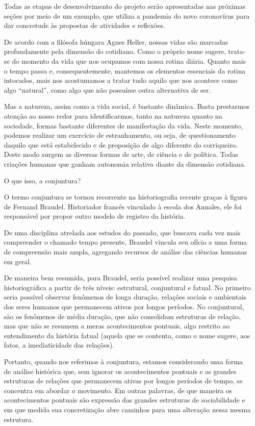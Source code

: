 Todas as etapas de desenvolvimento do projeto serão apresentadas nas próximas seções por meio de um exemplo, que utiliza a pandemia do novo coronavírus para dar concretude às propostas de atividades e reflexões.


De acordo com a filósofa húngara Agnes Heller, nossas vidas são marcadas profundamente pela dimensão do cotidiano. Como o próprio nome sugere, trata-se do momento da vida que nos ocupamos com nossa rotina diária. Quanto mais o tempo passa e, consequentemente, mantemos os elementos essenciais da rotina intocados, mais nos acostumamos a tratar tudo aquilo que nos acontece como algo “natural”, como algo que não possuísse outra alternativa de ser.

Mas a natureza, assim como a vida social, é bastante dinâmica. Basta prestarmos atenção ao nosso redor para identificarmos, tanto na natureza quanto na sociedade, formas bastante diferentes de manifestação da vida. Neste momento, podemos realizar um exercício de estranhamento, ou seja, de questionamento daquilo que está estabelecido e de proposição de algo diferente do corriqueiro. Deste modo surgem as diversas formas de arte, de ciência e de política. Todas criações humanas que ganham autonomia relativa diante da dimensão cotidiana.

\begin{knowledge}{O que isso, a conjuntura?}

O termo conjuntura se tornou recorrente na historiografia recente graças à figura de Fernand Braudel. Historiador francês vinculado à escola dos Annales, ele foi responsável por propor outro modelo de registro da  história.

De uma disciplina atrelada aos estudos do passado, que buscava cada vez mais compreender o chamado tempo presente, Braudel vincula seu ofício a uma forma de compreensão mais ampla, agregando recursos de análise das ciências humanas em geral.

De maneira bem resumida, para Braudel, seria possível realizar uma pesquisa historiográfica a partir de três níveis: estrutural, conjuntural e fatual. No primeiro seria possível observar fenômenos de longa duração, relações sociais e ambientais dos seres humanos que permanecem ativos por longos períodos. No conjuntural, são os fenômenos de média duração, que não consolidam estruturas de relação, mas que não se resumem a meras acontecimentos pontuais, algo restrito ao entendimento da história fatual (aquela que se contenta, como o nome sugere, aos fatos, a imediaticidade das relações).

Portanto, quando nos referimos à conjuntura, estamos considerando uma forma de análise histórica que, sem ignorar os acontecimentos pontuais e as grandes estruturas de relações que permanecem ativas por longos períodos de tempo, se concentra em abordar o movimento. Em outras palavras, de que maneira os acontecimentos pontuais são expressão das grandes estruturas de sociabilidade e em que medida sua concretização abre caminhos para uma alteração nessa mesma estrutura.

\end{knowledge}

